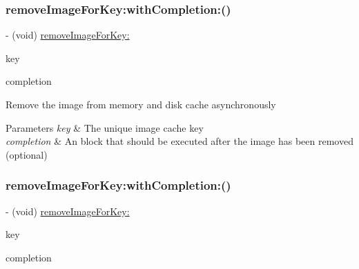 \subsubsection{\texorpdfstring{remove\+Image\+For\+Key\+:with\+Completion\+:()}{removeImageForKey:withCompletion:()}\hspace{0.1cm}{\footnotesize\ttfamily [1/3]}}
{\footnotesize\ttfamily -\/ (void) \mbox{\hyperlink{interface_s_d_image_cache_a1d6ca2afef59216e0cb1740d431833cf}{remove\+Image\+For\+Key\+:}} \begin{DoxyParamCaption}\item[{(N\+S\+String $\ast$)}]{key }\item[{withCompletion:(S\+D\+Web\+Image\+No\+Params\+Block)}]{completion }\end{DoxyParamCaption}}

Remove the image from memory and disk cache asynchronously


\begin{DoxyParams}{Parameters}
{\em key} & The unique image cache key \\
\hline
{\em completion} & An block that should be executed after the image has been removed (optional) \\
\hline
\end{DoxyParams}
\mbox{\label{interface_s_d_image_cache_add965b440292c9da74fc85b395a9812a}} 
\subsubsection{\texorpdfstring{remove\+Image\+For\+Key\+:with\+Completion\+:()}{removeImageForKey:withCompletion:()}\hspace{0.1cm}{\footnotesize\ttfamily [2/3]}}
{\footnotesize\ttfamily -\/ (void) \mbox{\hyperlink{interface_s_d_image_cache_a1d6ca2afef59216e0cb1740d431833cf}{remove\+Image\+For\+Key\+:}} \begin{DoxyParamCaption}\item[{(N\+S\+String $\ast$)}]{key }\item[{withCompletion:(S\+D\+Web\+Image\+No\+Params\+Block)}]{completion }\end{DoxyParamCaption}}

